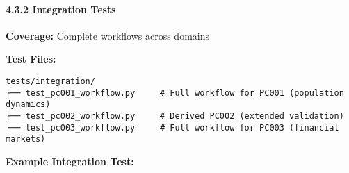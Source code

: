 \documentclass[
]{article}
\begin{document}
\paragraph{4.3.2 Integration Tests}\label{integration-tests}

\textbf{Coverage:} Complete workflows across domains

\textbf{Test Files:}

\begin{verbatim}
tests/integration/
├── test_pc001_workflow.py     # Full workflow for PC001 (population dynamics)
├── test_pc002_workflow.py     # Derived PC002 (extended validation)
└── test_pc003_workflow.py     # Full workflow for PC003 (financial markets)
\end{verbatim}

\textbf{Example Integration Test:}
\end{document}
